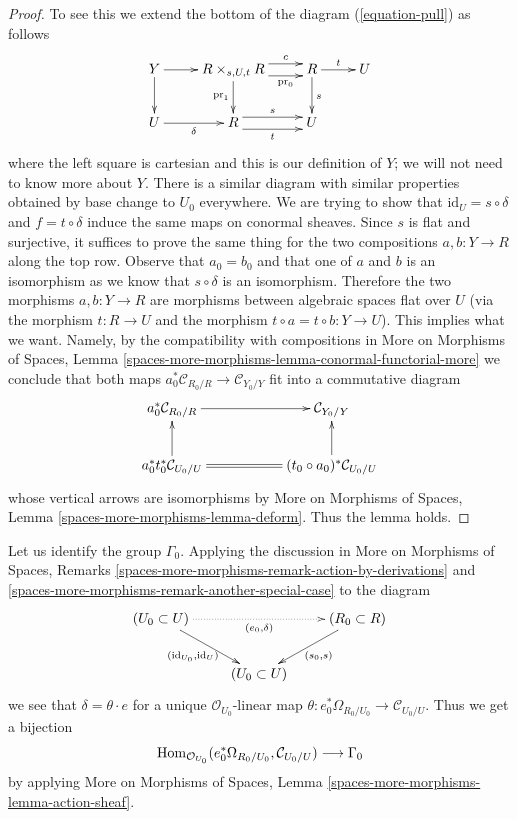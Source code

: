 \begin{proof}
To see this we extend the bottom of the diagram (\ref{equation-pull})
as follows
$$
\xymatrix{
Y \ar[r] \ar[d] &
R \times_{s, U, t} R
\ar@<1ex>[r]^-c \ar@<-1ex>[r]_-{\text{pr}_0} \ar[d]_{\text{pr}_1} &
R \ar[r]^t \ar[d]^s &
U \\
U \ar[r]_\delta &
R \ar@<1ex>[r]^s \ar@<-1ex>[r]_t &
U
}
$$
where the left square is cartesian and this is our definition
of $Y$; we will not need to know more about $Y$.
There is a similar diagram with similar properties obtained by
base change to $U_0$ everywhere.
We are trying to show that $\text{id}_U = s \circ \delta$
and $f = t \circ \delta$ induce the same maps on conormal sheaves.
Since $s$ is flat and surjective, it suffices to prove the same
thing for the two compositions $a, b : Y \to R$ along the top row.
Observe that $a_0 = b_0$ and that one of $a$ and $b$ is an isomorphism
as we know that $s \circ \delta$ is an isomorphism. Therefore
the two morphisms $a, b : Y \to R$ are morphisms between
algebraic spaces flat over $U$ (via the morphism $t : R \to U$
and the morphism $t \circ a = t \circ b : Y \to U$).
This implies what we want. Namely, by the compatibility with compositions in
More on Morphisms of Spaces, Lemma
\ref{spaces-more-morphisms-lemma-conormal-functorial-more}
we conclude that both maps
$a_0^*\mathcal{C}_{R_0/R} \to \mathcal{C}_{Y_0/Y}$
fit into a commutative diagram
$$
\xymatrix{
a_0^*\mathcal{C}_{R_0/R} \ar[rr] & & \mathcal{C}_{Y_0/Y} \\
a_0^*t_0^*\mathcal{C}_{U_0/U} \ar[u] \ar@{=}[rr] & &
(t_0 \circ a_0)^*\mathcal{C}_{U_0/U} \ar[u]
}
$$
whose vertical arrows are isomorphisms by
More on Morphisms of Spaces, Lemma
\ref{spaces-more-morphisms-lemma-deform}.
Thus the lemma holds.
\end{proof}

\noindent
Let us identify the group $\Gamma_0$.
Applying the discussion in More on Morphisms of Spaces, Remarks
\ref{spaces-more-morphisms-remark-action-by-derivations} and
\ref{spaces-more-morphisms-remark-another-special-case}
to the diagram
$$
\xymatrix{
(U_0 \subset U) \ar@{..>}[rr]_{(e_0, \delta)}
\ar[rd]_{(\text{id}_{U_0}, \text{id}_U)} & &
(R_0 \subset R) \ar[ld]^{(s_0, s)} \\
& (U_0 \subset U)
}
$$
we see that $\delta = \theta \cdot e$ for a unique
$\mathcal{O}_{U_0}$-linear map
$\theta : e_0^*\Omega_{R_0/U_0} \to \mathcal{C}_{U_0/U}$.
Thus we get a bijection
\begin{equation}
\label{equation-isomorphism}
\mathop{\mathrm{Hom}}\nolimits_{\mathcal{O}_{U_0}}(e_0^*\Omega_{R_0/U_0}, \mathcal{C}_{U_0/U})
\longrightarrow
\Gamma_0
\end{equation}
by applying More on Morphisms of Spaces, Lemma
\ref{spaces-more-morphisms-lemma-action-sheaf}.

